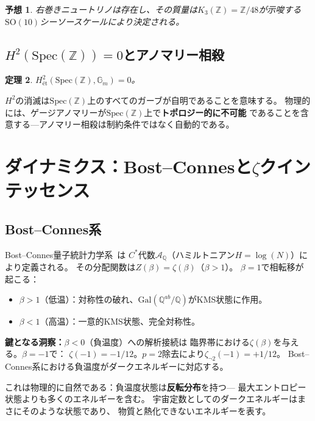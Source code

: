 \documentclass[12pt,a4paper]{article}
\newtheorem{theorem}{定理}[section]
\newtheorem{conjecture}[theorem]{予想}
\theoremstyle{definition}
\newcommand{\Spec}{\mathrm{Spec}}
\newcommand{\Gal}{\mathrm{Gal}}
\newcommand{\Z}{\mathbb{Z}}
\newcommand{\Q}{\mathbb{Q}}
\newcommand{\zetanot}{\zeta_{\neg 2}}
\begin{document}
\begin{conjecture}
右巻きニュートリノは存在し、その質量は$K_3(\Z)=\Z/48$が示唆する
$\mathrm{SO}(10)$シーソースケールにより決定される。
\end{conjecture}

\subsection{$H^2(\Spec(\Z))=0$とアノマリー相殺}

\begin{theorem}
$H^2_{\text{\'et}}(\Spec(\Z),\mathbb{G}_m)=0$。
\end{theorem}

$H^2$の消滅は$\Spec(\Z)$上のすべてのガーブが自明であることを意味する。
物理的には、ゲージアノマリーが$\Spec(\Z)$上で\textbf{トポロジー的に不可能}
であることを含意する—アノマリー相殺は制約条件ではなく自動的である。

\section{ダイナミクス：Bost--Connesと$\zeta$クインテッセンス}\label{sec:dynamics}

\subsection{Bost--Connes系}

Bost--Connes量子統計力学系~\cite{BostConnes}は
$C^*$代数$\mathcal{A}_\Q$（ハミルトニアン$H=\log(N)$）により定義される。
その分配関数は$Z(\beta)=\zeta(\beta)$（$\beta>1$）。
$\beta=1$で相転移が起こる：
\begin{itemize}
\item $\beta>1$（低温）：対称性の破れ、$\Gal(\Q^{ab}/\Q)$がKMS状態に作用。
\item $\beta<1$（高温）：一意的KMS状態、完全対称性。
\end{itemize}

\textbf{鍵となる洞察：}$\beta<0$（負温度）への解析接続は
臨界帯における$\zeta(\beta)$を与える。$\beta=-1$で：
$\zeta(-1)=-1/12$。$p=2$除去により$\zetanot(-1)=+1/12$。
Bost--Connes系における負温度がダークエネルギーに対応する。

これは物理的に自然である：負温度状態は\textbf{反転分布}を持つ—
最大エントロピー状態よりも多くのエネルギーを含む。
宇宙定数としてのダークエネルギーはまさにそのような状態であり、
物質と熱化できないエネルギーを表す。
\end{document}

